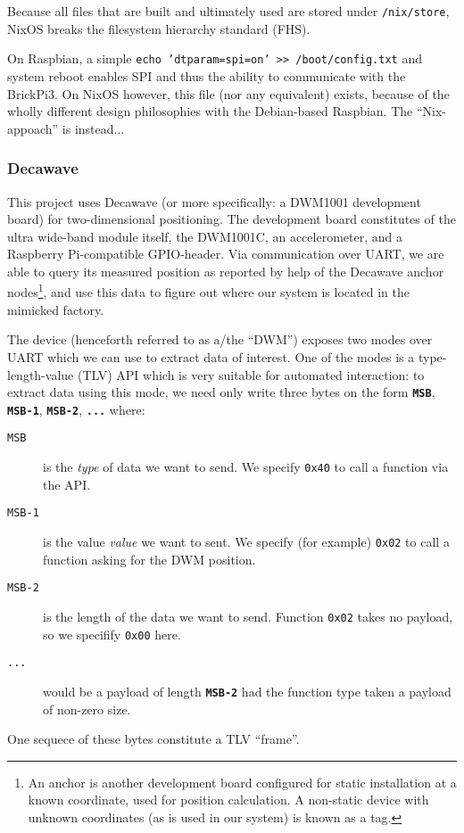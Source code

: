 Because all files that are built and ultimately used are stored under \texttt{/nix/store}, NixOS breaks the filesystem hierarchy standard (FHS).


On Raspbian, a simple \texttt{echo 'dtparam=spi=on' >> /boot/config.txt} and system reboot enables SPI and thus the ability to communicate with the BrickPi3.
On NixOS however, this file (nor any equivalent) exists, because of the wholly different design philosophies with the Debian-based Raspbian.
The ``Nix-appoach'' is instead...

\subsubsection{Decawave}
This project uses Decawave (or more specifically: a DWM1001 development board) for two-dimensional positioning.
The development board constitutes of the ultra wide-band module itself, the DWM1001C, an accelerometer,
and a Raspberry Pi-compatible GPIO-header.
Via communication over UART, we are able to query its measured position as reported by help of the Decawave anchor nodes\footnote{An anchor is another development board configured for static installation at a known coordinate, used for position calculation. A non-static device with unknown coordinates (as is used in our system) is known as a tag.},
and use this data to figure out where our system is located in the mimicked factory.

The device (henceforth referred to as a/the ``DWM'') exposes two modes over UART which we can use to extract data of interest.
One of the modes is a type-length-value (TLV) API which is very suitable for automated interaction:
to extract data using this mode, we need only write three bytes on the form \texttt{\textbf{MSB}}, \texttt{\textbf{MSB-1}}, \texttt{\textbf{MSB-2}}, \texttt{\textbf{...}} where:
\begin{description}
\item[\texttt{MSB}] is the \textit{type} of data we want to send. We specify \texttt{0x40} to call a function via the API.
\item[\texttt{MSB-1}] is the value \textit{value} we want to sent. We specify (for example) \texttt{0x02} to call a function asking for the DWM position.
\item[\texttt{MSB-2}] is the length of the data we want to send. Function \texttt{0x02} takes no payload, so we specifify \texttt{0x00} here.
\item[\texttt{...}] would be a payload of length \texttt{\textbf{MSB-2}} had the function type taken a payload of non-zero size.
\end{description}
One sequece of these bytes constitute a TLV ``frame''.

